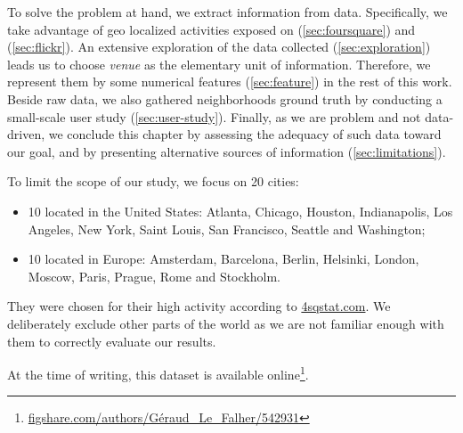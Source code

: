 To solve the problem at hand, we extract information from data. Specifically,
we take advantage of geo localized activities exposed on \fs{}
(\autoref{sec:foursquare}) and \flickr{} (\autoref{sec:flickr}). An extensive
exploration of the data collected (\autoref{sec:exploration}) leads us to
choose \emph{venue} as the elementary unit of information. Therefore, we
represent them by some numerical features (\autoref{sec:feature}) in the rest
of this work. Beside raw data, we also gathered neighborhoods ground truth by conducting a
small-scale user study (\autoref{sec:user-study}). Finally, as we are problem
and not data-driven, we conclude this chapter by assessing the adequacy of such
data toward our goal, and by presenting alternative sources of information
(\autoref{sec:limitations}).

To limit the scope of our study, we focus on 20 cities:
\begin{itemize}
	\item 10 located in the United States: Atlanta, Chicago, Houston,
		Indianapolis, Los Angeles, New York, Saint Louis, San Francisco,
		Seattle and Washington;
	\item 10 located in Europe: Amsterdam, Barcelona, Berlin, Helsinki, London,
		Moscow, Paris, Prague, Rome and Stockholm.
\end{itemize}

They were chosen for their high activity according to
\href{http://www.4sqstat.com/}{4sqstat.com}. We deliberately exclude other
parts of the world as we are not familiar enough with them to correctly
evaluate our results.

At the time of writing, this dataset is available online\footnote{%
\href{http://figshare.com/authors/G\%C3\%A9raud_Le_Falher/542931}%
{\url{figshare.com/authors/Géraud_Le_Falher/542931}}}.
